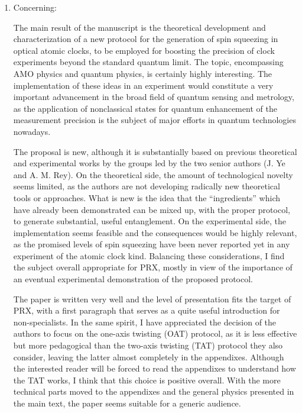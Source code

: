 \documentclass[reprint,onecolumn,12pt]{revtex4-2}
\newcommand{\blue}[1]{{\color{blue} #1}}
\begin{document}
\begin{enumerate}
\item Concerning:

  \blue{The main result of the manuscript is the theoretical
    development and characterization of a new protocol for the
    generation of spin squeezing in optical atomic clocks, to be
    employed for boosting the precision of clock experiments beyond
    the standard quantum limit. The topic, encompassing AMO physics
    and quantum physics, is certainly highly interesting. The
    implementation of these ideas in an experiment would constitute a
    very important advancement in the broad field of quantum sensing
    and metrology, as the application of nonclassical states for
    quantum enhancement of the measurement precision is the subject of
    major efforts in quantum technologies nowadays.}

  \blue{The proposal is new, although it is substantially based on
    previous theoretical and experimental works by the groups led by
    the two senior authors (J. Ye and A. M. Rey). On the theoretical
    side, the amount of technological novelty seems limited, as the
    authors are not developing radically new theoretical tools or
    approaches. What is new is the idea that the ``ingredients'' which
    have already been demonstrated can be mixed up, with the proper
    protocol, to generate substantial, useful entanglement. On the
    experimental side, the implementation seems feasible and the
    consequences would be highly relevant, as the promised levels of
    spin squeezing have been never reported yet in any experiment of
    the atomic clock kind. Balancing these considerations, I find the
    subject overall appropriate for PRX, mostly in view of the
    importance of an eventual experimental demonstration of the
    proposed protocol.}

  \blue{The paper is written very well and the level of presentation
    fits the target of PRX, with a first paragraph that serves as a
    quite useful introduction for non-specialists. In the same spirit,
    I have appreciated the decision of the authors to focus on the
    one-axis twisting (OAT) protocol, as it is less effective but more
    pedagogical than the two-axis twisting (TAT) protocol they also
    consider, leaving the latter almost completely in the
    appendixes. Although the interested reader will be forced to read
    the appendixes to understand how the TAT works, I think that this
    choice is positive overall. With the more technical parts moved to
    the appendixes and the general physics presented in the main text,
    the paper seems suitable for a generic audience.}


\end{enumerate}
\end{document}
